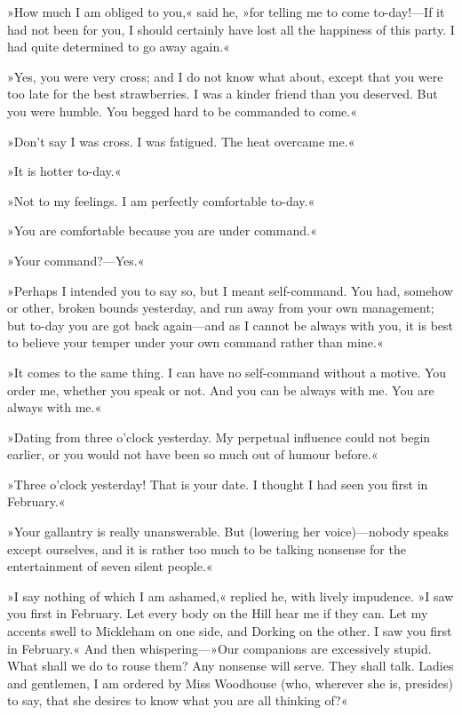 »How much I am obliged to you,« said he, »for telling me to come to-day!—If it had not been for you, I should certainly have lost all the happiness of this party. I had quite determined to go away again.«

»Yes, you were very cross; and I do not know what about, except that you were too late for the best strawberries. I was a kinder friend than you deserved. But you were humble. You begged hard to be commanded to come.«

»Don't say I was cross. I was fatigued. The heat overcame me.«

»It is hotter to-day.«

»Not to my feelings. I am perfectly comfortable to-day.«

»You are comfortable because you are under command.«

»Your command?—Yes.«

»Perhaps I intended you to say so, but I meant self-command. You had, somehow or other, broken bounds yesterday, and run away from your own management; but to-day you are got back again—and as I cannot be always with you, it is best to believe your temper under your own command rather than mine.«

»It comes to the same thing. I can have no self-command without a motive. You order me, whether you speak or not. And you can be always with me. You are always with me.«

»Dating from three o'clock yesterday. My perpetual influence could not begin earlier, or you would not have been so much out of humour before.«

»Three o'clock yesterday! That is your date. I thought I had seen you first in February.«

»Your gallantry is really unanswerable. But (lowering her voice)—nobody speaks except ourselves, and it is rather too much to be talking nonsense for the entertainment of seven silent people.«

»I say nothing of which I am ashamed,« replied he, with lively impudence. »I saw you first in February. Let every body on the Hill hear me if they can. Let my accents swell to Mickleham on one side, and Dorking on the other. I saw you first in February.« And then whispering—»Our companions are excessively stupid. What shall we do to rouse them? Any nonsense will serve. They shall talk. Ladies and gentlemen, I am ordered by Miss Woodhouse (who, wherever she is, presides) to say, that she desires to know what you are all thinking of?«

